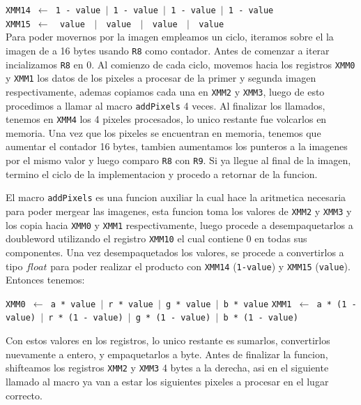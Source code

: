\noindent
\texttt{XMM14 $\gets$ 1 - value $\vert$ 1 - value $\vert$ 1 - value $\vert$ 1 - value}\\
\texttt{XMM15 $\gets\ \ $ value $\ \ \vert\ \ $ value $\ \ \vert\ \ $ value $\ \ \vert\ \ $ value}\\

Para poder movernos por la imagen empleamos un ciclo, iteramos sobre el la imagen de a 16 bytes usando \texttt{R8} como contador. Antes de comenzar a iterar incializamos \texttt{R8} en 0. Al comienzo de cada ciclo, movemos hacia los registros \texttt{XMM0} y \texttt{XMM1} los datos de los pixeles a procesar de la primer y segunda imagen respectivamente, ademas copiamos cada una en \texttt{XMM2} y \texttt{XMM3}, luego de esto procedimos a llamar al macro \texttt{addPixels} 4 veces. Al finalizar los llamados, tenemos en \texttt{XMM4} los 4 pixeles procesados, lo unico restante fue volcarlos en memoria. Una vez que los pixeles se encuentran en memoria, tenemos que aumentar el contador 16 bytes, tambien aumentamos los punteros a la imagenes por el mismo valor y luego comparo \texttt{R8} con \texttt{R9}. Si ya llegue al final de la imagen, termino el ciclo de la implementacion y procedo a retornar de la funcion.

El macro \texttt{addPixels} es una funcion auxiliar la cual hace la aritmetica necesaria para poder mergear las imagenes, esta funcion toma los valores de \texttt{XMM2} y \texttt{XMM3} y los copia hacia \texttt{XMM0} y \texttt{XMM1} respectivamente, luego procede a desempaquetarlos a doubleword utilizando el registro \texttt{XMM10} el cual contiene 0 en todas sus componentes. Una vez desempaquetados los valores, se procede a convertirlos a tipo $float$ para poder realizar el producto con \texttt{XMM14} (\texttt{1-value}) y \texttt{XMM15} (\texttt{value}). Entonces tenemos:

\noindent
\texttt{XMM0 $\gets$ a * value $\vert$ r * value $\vert$ g * value $\vert$ b * value}
\texttt{XMM1 $\gets$ a * (1 - value) $\vert$ r * (1 - value) $\vert$ g * (1 - value) $\vert$ b * (1 - value)}

Con estos valores en los registros, lo unico restante es sumarlos, convertirlos nuevamente a entero, y empaquetarlos a byte. Antes de finalizar la funcion, shifteamos los registros \texttt{XMM2} y \texttt{XMM3} 4 bytes a la derecha, asi en el siguiente llamado al macro ya van a estar los siguientes pixeles a procesar en el lugar correcto.

